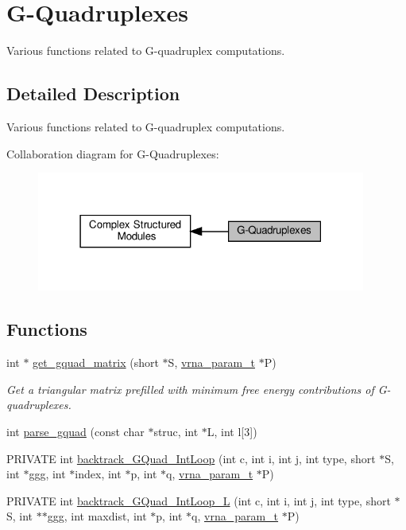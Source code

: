 \hypertarget{group__gquads}{}\section{G-\/\+Quadruplexes}
\label{group__gquads}


Various functions related to G-\/quadruplex computations.  




\subsection{Detailed Description}
Various functions related to G-\/quadruplex computations. 

Collaboration diagram for G-\/\+Quadruplexes\+:
\nopagebreak
\begin{figure}[H]
\begin{center}
\leavevmode
\includegraphics[width=307pt]{group__gquads}
\end{center}
\end{figure}
\subsection*{Functions}
\begin{DoxyCompactItemize}
\item 
int $\ast$ \hyperlink{group__gquads_ga392e45c9615aa123737671603fa4203c}{get\+\_\+gquad\+\_\+matrix} (short $\ast$S, \hyperlink{group__energy__parameters_ga8a69ca7d787e4fd6079914f5343a1f35}{vrna\+\_\+param\+\_\+t} $\ast$P)
\begin{DoxyCompactList}\small\item\em Get a triangular matrix prefilled with minimum free energy contributions of G-\/quadruplexes. \end{DoxyCompactList}\item 
int \hyperlink{group__gquads_gae41763215b9c64d2a7b67f0df8a28078}{parse\+\_\+gquad} (const char $\ast$struc, int $\ast$L, int l\mbox{[}3\mbox{]})
\item 
P\+R\+I\+V\+A\+TE int \hyperlink{group__gquads_ga220c41e8dbcee940ac975b8ce88e55c5}{backtrack\+\_\+\+G\+Quad\+\_\+\+Int\+Loop} (int c, int i, int j, int type, short $\ast$S, int $\ast$ggg, int $\ast$index, int $\ast$p, int $\ast$q, \hyperlink{group__energy__parameters_ga8a69ca7d787e4fd6079914f5343a1f35}{vrna\+\_\+param\+\_\+t} $\ast$P)
\item 
P\+R\+I\+V\+A\+TE int \hyperlink{group__gquads_ga7b371308fa5a45c7ac353ef6ed1014de}{backtrack\+\_\+\+G\+Quad\+\_\+\+Int\+Loop\+\_\+L} (int c, int i, int j, int type, short $\ast$S, int $\ast$$\ast$ggg, int maxdist, int $\ast$p, int $\ast$q, \hyperlink{group__energy__parameters_ga8a69ca7d787e4fd6079914f5343a1f35}{vrna\+\_\+param\+\_\+t} $\ast$P)
\end{DoxyCompactItemize}


